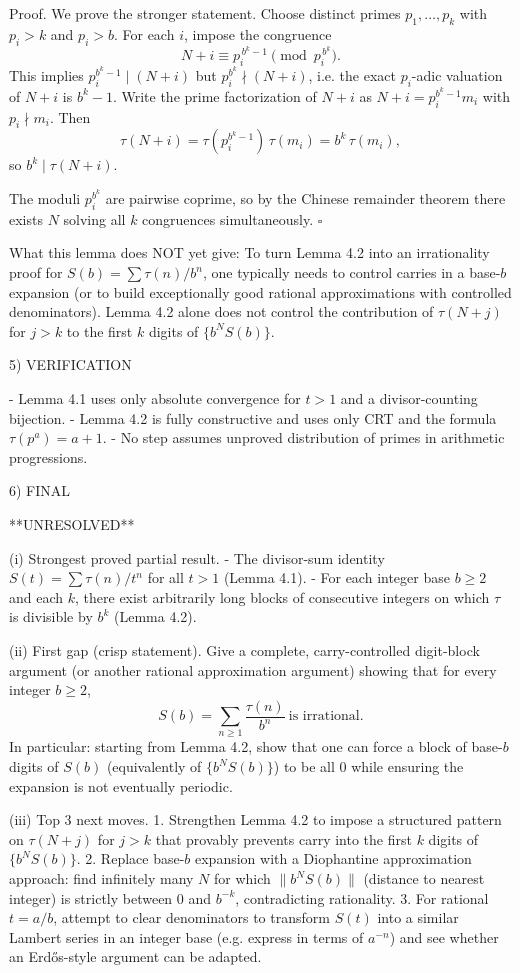 Proof.
We prove the stronger statement.
Choose distinct primes $p_1,\dots,p_k$ with $p_i>k$ and $p_i> b$.
For each $i$, impose the congruence
\[
  N+i \equiv p_i^{\,b^k-1} \pmod{p_i^{\,b^k}}.
\]
This implies $p_i^{b^k-1}\mid (N+i)$ but $p_i^{b^k}\nmid (N+i)$, i.e.
the exact $p_i$-adic valuation of $N+i$ is $b^k-1$.
Write the prime factorization of $N+i$ as
$N+i=p_i^{b^k-1}m_i$ with $p_i\nmid m_i$.
Then
\[
  \tau(N+i)=\tau(p_i^{b^k-1})\,\tau(m_i)=b^k\,\tau(m_i),
\]
so $b^k\mid\tau(N+i)$.

The moduli $p_i^{b^k}$ are pairwise coprime, so by the Chinese remainder theorem there exists $N$
solving all $k$ congruences simultaneously.
$\square$

What this lemma does NOT yet give:
To turn Lemma 4.2 into an irrationality proof for $S(b)=\sum \tau(n)/b^n$, one typically needs to
control carries in a base-$b$ expansion (or to build exceptionally good rational approximations with
controlled denominators). Lemma 4.2 alone does not control the contribution of $\tau(N+j)$ for
$j>k$ to the first $k$ digits of $\{b^N S(b)\}$.

5) VERIFICATION

- Lemma 4.1 uses only absolute convergence for $t>1$ and a divisor-counting bijection.
- Lemma 4.2 is fully constructive and uses only CRT and the formula $\tau(p^a)=a+1$.
- No step assumes unproved distribution of primes in arithmetic progressions.

6) FINAL

**UNRESOLVED**

(i) Strongest proved partial result.
- The divisor-sum identity $S(t)=\sum \tau(n)/t^n$ for all $t>1$ (Lemma 4.1).
- For each integer base $b\ge 2$ and each $k$, there exist arbitrarily long blocks of consecutive integers
  on which $\tau$ is divisible by $b^k$ (Lemma 4.2).

(ii) First gap (crisp statement).
Give a complete, carry-controlled digit-block argument (or another rational approximation argument)
showing that for every integer $b\ge 2$,
\[
  S(b)=\sum_{n\ge 1}\frac{\tau(n)}{b^n}\ \text{is irrational}.
\]
In particular: starting from Lemma 4.2, show that one can force a block of base-$b$ digits of $S(b)$
(equivalently of $\{b^N S(b)\}$) to be all $0$ while ensuring the expansion is not eventually periodic.

(iii) Top 3 next moves.
1. Strengthen Lemma 4.2 to impose a structured pattern on $\tau(N+j)$ for $j>k$ that provably prevents
   carry into the first $k$ digits of $\{b^N S(b)\}$.
2. Replace base-$b$ expansion with a Diophantine approximation approach: find infinitely many $N$ for which
   $\|b^N S(b)\|$ (distance to nearest integer) is strictly between $0$ and $b^{-k}$, contradicting rationality.
3. For rational $t=a/b$, attempt to clear denominators to transform $S(t)$ into a similar Lambert series
   in an integer base (e.g. express in terms of $a^{-n}$) and see whether an Erd\H{o}s-style argument can
   be adapted.


